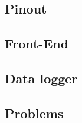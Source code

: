 \documentclass[12pt,a4paper,titlepage,oneside]{article}
\begin{document}
\subsection{Pinout}


\subsection{Front-End}


\subsection{Data logger}


\subsection{Problems}




\clearpage 
{}
{}


\printindex
\printindex
\end{document}
